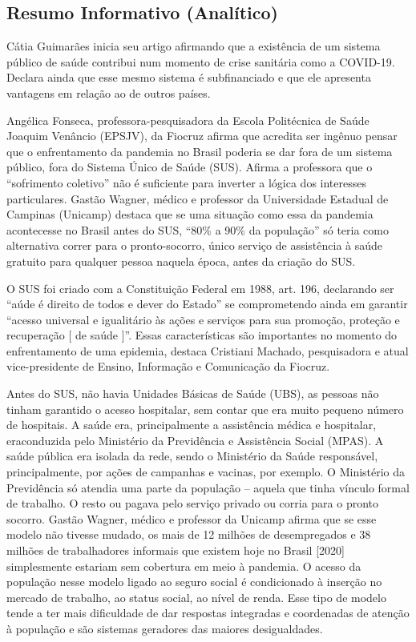\documentclass[
]{book}
\begin{document}
\hypertarget{resumo-informativo-analuxedtico}{%
\subsection{Resumo Informativo (Analítico)}\label{resumo-informativo-analuxedtico}}

Cátia Guimarães inicia seu artigo afirmando que a existência de um sistema público de saúde contribui num momento de crise sanitária como a COVID-19. Declara ainda que esse mesmo sistema é subfinanciado e que ele apresenta vantagens em relação ao de outros países.

Angélica Fonseca, professora-pesquisadora da Escola Politécnica de Saúde Joaquim Venâncio (EPSJV), da Fiocruz afirma que acredita ser ingênuo pensar que o enfrentamento da pandemia no Brasil poderia se dar fora de um sistema público, fora do Sistema Único de Saúde (SUS). Afirma a professora que o ``sofrimento coletivo'' não é suficiente para inverter a lógica dos interesses particulares. Gastão Wagner, médico e professor da Universidade Estadual de Campinas (Unicamp) destaca que se uma situação como essa da pandemia acontecesse no Brasil antes do SUS, ``80\% a 90\% da população'' só teria como alternativa correr para o pronto-socorro, único serviço de assistência à saúde gratuito para qualquer pessoa naquela época, antes da criação do SUS.

O SUS foi criado com a Constituição Federal em 1988, art. 196, declarando ser ``aúde é direito de todos e dever do Estado'' se comprometendo ainda em garantir ``acesso universal e igualitário às ações e serviços para sua promoção, proteção e recuperação {[} de saúde {]}''. Essas características são importantes no momento do enfrentamento de uma epidemia, destaca Cristiani Machado, pesquisadora e atual vice-presidente de Ensino, Informação e Comunicação da Fiocruz.

Antes do SUS, não havia Unidades Básicas de Saúde (UBS), as pessoas não tinham garantido o acesso hospitalar, sem contar que era muito pequeno número de hospitais. A saúde era, principalmente a assistência médica e hospitalar, eraconduzida pelo Ministério da Previdência e Assistência Social (MPAS). A saúde pública era isolada da rede, sendo o Ministério da Saúde responsável, principalmente, por ações de campanhas e vacinas, por exemplo. O Ministério da Previdência só atendia uma parte da população -- aquela que tinha vínculo formal de trabalho. O resto ou pagava pelo serviço privado ou corria para o pronto socorro. Gastão Wagner, médico e professor da Unicamp afirma que se esse modelo não tivesse mudado, os mais de 12 milhões de desempregados e 38 milhões de trabalhadores informais que existem hoje no Brasil {[}2020{]} simplesmente estariam sem cobertura em meio à pandemia. O acesso da população nesse modelo ligado ao seguro social é condicionado à inserção no mercado de trabalho, ao status social, ao nível de renda. Esse tipo de modelo tende a ter mais dificuldade de dar respostas integradas e coordenadas de atenção à população e são sistemas geradores das maiores desigualdades.
\end{document}
